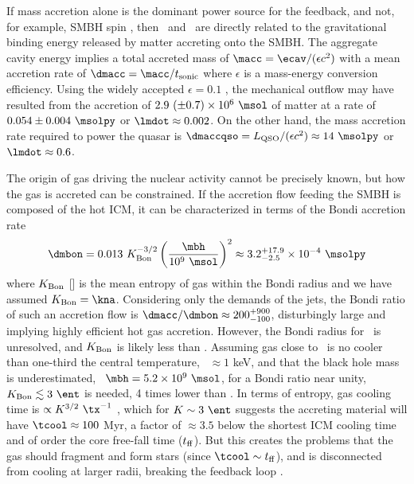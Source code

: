 \documentclass[useAMS,usenatbib]{mn2e}
\begin{document}
If mass accretion alone is the dominant power source for the feedback,
and not, for example, SMBH spin \citep{2002NewAR..46..247M, minaspin},
then \pcav\ and \lqso\ are directly related to the gravitational
binding energy released by matter accreting onto the SMBH. The
aggregate cavity energy implies a total accreted mass of $\macc =
\ecav/(\epsilon c^2)$ with a mean accretion rate of $\dmacc =
\macc/t_{\rm{sonic}}$ where $\epsilon$ is a mass-energy conversion
efficiency. Using the widely accepted $\epsilon = 0.1$
\citep{2002apa..book.....F}, the mechanical outflow may have resulted
from the accretion of $2.9 ~(\pm 0.7) \times 10^{6} ~\msol$ of matter
at a rate of $0.054 \pm 0.004 ~\msolpy$ or $\lmdot \approx 0.002$. On
the other hand, the mass accretion rate required to power the quasar
is $\dmaccqso = \lqso/(\epsilon c^2) \approx 14 ~\msolpy$ or $\lmdot
\approx 0.6$.

The origin of gas driving the nuclear activity cannot be precisely
known, but how the gas is accreted can be constrained. If the
accretion flow feeding the SMBH is composed of the hot ICM, it can be
characterized in terms of the Bondi accretion rate
\begin{equation}
  \dmbon = 0.013 ~K_{\rm{Bon}}^{-3/2} \left(\frac{\mbh}{10^9
    ~\msol}\right)^{2} \approx 3.2^{+17.9}_{-2.5} \times 10^{-4}
  ~\msolpy
\end{equation}
where $K_{\rm{Bon}}$ [\ent] is the mean entropy of gas within the
Bondi radius and we have assumed $K_{\rm{Bon}} = \kna$. Considering
only the demands of the jets, the Bondi ratio of such an accretion
flow is $\dmacc/\dmbon \approx 200^{+900}_{-100}$, disturbingly large
and implying highly efficient hot gas accretion. However, the Bondi
radius for \irs\ is unresolved, and $K_{\rm{Bon}}$ is likely less than
\kna. Assuming gas close to \rbon\ is no cooler than one-third the
central temperature, \ie\ $\approx 1$ keV, and that the black hole
mass is underestimated, \ie\ $\mbh = 5.2 \times 10^9 ~\msol$, for a
Bondi ratio near unity, $K_{\rm{Bon}} \la 3 ~\ent$ is needed, 4 times
lower than \kna. In terms of entropy, gas cooling time is $\propto
K^{3/2} ~\tx^{-1}$ \citep{d06}, which for $K \sim 3 ~\ent$ suggests
the accreting material will have $\tcool \approx 100$ Myr, a factor of
$\approx 3.5$ below the shortest ICM cooling time and of order the
core free-fall time ($t_{\rm{ff}}$). But this creates the problems
that the gas should fragment and form stars (since $\tcool \sim
t_{\rm{ff}}$), and is disconnected from cooling at larger radii,
breaking the feedback loop \citep{2006NewA...12...38S}.
\end{document}
